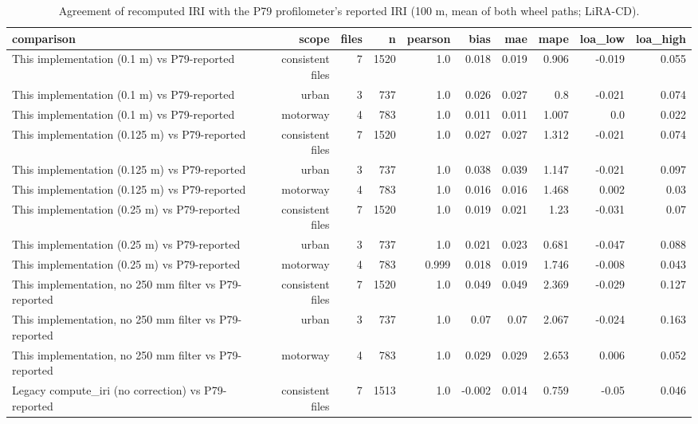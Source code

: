 \begin{table}[!htbp]
\centering
\footnotesize
\caption{Agreement of recomputed IRI with the P79 profilometer's reported IRI (100 m, mean of both wheel paths; LiRA-CD).}
\label{tab:iri_validation}
\begin{adjustbox}{max width=\columnwidth}
\begin{tabular}{lrrrrrrrrr}
\toprule
\textbf{comparison} & \textbf{scope} & \textbf{files} & \textbf{n} & \textbf{pearson} & \textbf{bias} & \textbf{mae} & \textbf{mape} & \textbf{loa\_low} & \textbf{loa\_high} \\
\midrule
This implementation (0.1 m) vs P79-reported & consistent files & 7 & 1520 & 1.0 & 0.018 & 0.019 & 0.906 & -0.019 & 0.055 \\
This implementation (0.1 m) vs P79-reported & urban & 3 & 737 & 1.0 & 0.026 & 0.027 & 0.8 & -0.021 & 0.074 \\
This implementation (0.1 m) vs P79-reported & motorway & 4 & 783 & 1.0 & 0.011 & 0.011 & 1.007 & 0.0 & 0.022 \\
This implementation (0.125 m) vs P79-reported & consistent files & 7 & 1520 & 1.0 & 0.027 & 0.027 & 1.312 & -0.021 & 0.074 \\
This implementation (0.125 m) vs P79-reported & urban & 3 & 737 & 1.0 & 0.038 & 0.039 & 1.147 & -0.021 & 0.097 \\
This implementation (0.125 m) vs P79-reported & motorway & 4 & 783 & 1.0 & 0.016 & 0.016 & 1.468 & 0.002 & 0.03 \\
This implementation (0.25 m) vs P79-reported & consistent files & 7 & 1520 & 1.0 & 0.019 & 0.021 & 1.23 & -0.031 & 0.07 \\
This implementation (0.25 m) vs P79-reported & urban & 3 & 737 & 1.0 & 0.021 & 0.023 & 0.681 & -0.047 & 0.088 \\
This implementation (0.25 m) vs P79-reported & motorway & 4 & 783 & 0.999 & 0.018 & 0.019 & 1.746 & -0.008 & 0.043 \\
This implementation, no 250 mm filter vs P79-reported & consistent files & 7 & 1520 & 1.0 & 0.049 & 0.049 & 2.369 & -0.029 & 0.127 \\
This implementation, no 250 mm filter vs P79-reported & urban & 3 & 737 & 1.0 & 0.07 & 0.07 & 2.067 & -0.024 & 0.163 \\
This implementation, no 250 mm filter vs P79-reported & motorway & 4 & 783 & 1.0 & 0.029 & 0.029 & 2.653 & 0.006 & 0.052 \\
Legacy compute\_iri (no correction) vs P79-reported & consistent files & 7 & 1513 & 1.0 & -0.002 & 0.014 & 0.759 & -0.05 & 0.046 \\

\end{tabular}
\end{adjustbox}
\end{table}
